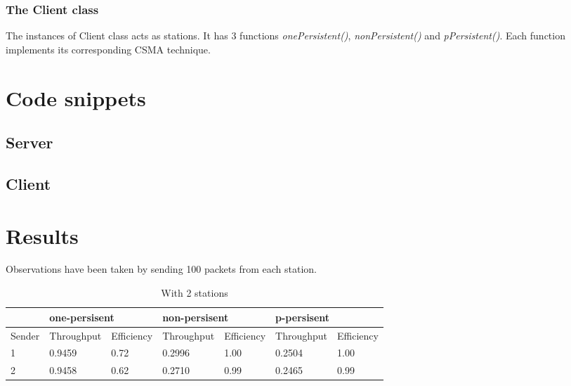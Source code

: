 \documentclass[14pt,titlepage, a4paper]{extarticle}
\begin{document}
\subsubsection{The Client class}
The instances of Client class acts as stations. It has 3 functions 
\emph{onePersistent()}, \emph{nonPersistent()} and \emph{pPersistent()}.
Each function implements its corresponding CSMA technique.

\par\null\par
{}



\section{Code snippets}
\subsection{Server}

\subsection{Client}


\section{Results}
Observations have been taken by sending 100 packets from each station.

\begin{table}[!ht]
	\caption{With 2 stations}
	\bigskip
	\begin{tabular}{|l|l|l|l|l|l|l|}
		\hline
		&
		\multicolumn{2}{|l|}{one-persisent} & 
		\multicolumn{2}{|l|}{non-persisent} & 
		\multicolumn{2}{|l|}{p-persisent}\\
		\hline
		Sender &
		Throughput & Efficiency & 
		Throughput & Efficiency & 
		Throughput & Efficiency \\ 
		\hline
		1 & 
		0.9459 & 0.72 &
		0.2996 & 1.00 & 
		0.2504 & 1.00\\
		\hline
		2 &
		0.9458 & 0.62 & 
		0.2710 & 0.99 
		& 0.2465 & 0.99\\
		\hline
	\end{tabular}
\end{table}
\end{document}
